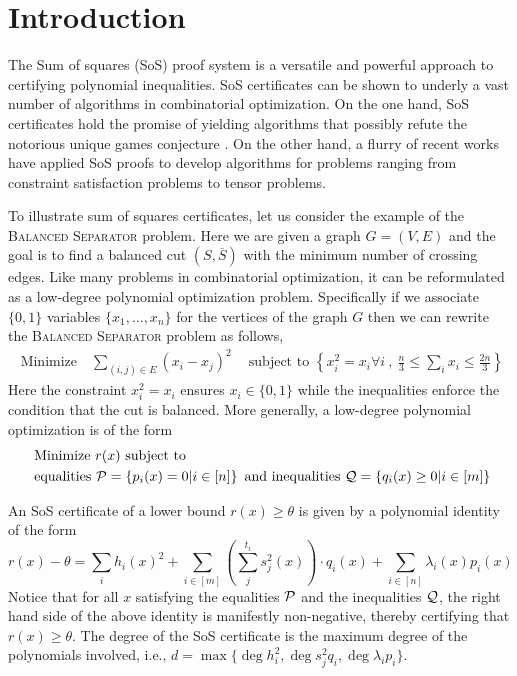 \section{Introduction}
\label{sec:intro}

The Sum of squares (SoS) proof system is a versatile and powerful approach to certifying polynomial inequalities. 
%
SoS certificates can be shown to underly a vast number of algorithms in combinatorial optimization. 
%
On the one hand, SoS certificates hold the promise of yielding algorithms that possibly refute the notorious unique games conjecture \cite{BBHKSZ12, barak2011rounding,GuruswamiS11}.  
%
On the other hand, a flurry of recent works have applied SoS proofs to develop algorithms for problems ranging from constraint satisfaction problems to tensor problems.  

To illustrate sum of squares certificates, let us consider the example of the
\textsc{Balanced Separator} problem.  Here we are given a graph $G = (V,E)$ and the goal is to find a balanced cut $(S,\overline{S})$ with the minimum number of crossing edges.
%
Like many problems in combinatorial optimization, it can be reformulated as a low-degree polynomial optimization problem.  
%
Specifically if we associate $\{0,1\}$ variables $\{x_1,\ldots,x_n\}$ for the vertices of the graph $G$ then we can rewrite the \textsc{Balanced Separator} problem as follows,
\begin{align*}
\text{ Minimize } \ \ \  \sum_{(i,j) \in E} (x_i-x_j)^2  \ \ \ \ \text{ subject to } \left\{ x_i^2 = x_i \forall i\ , \ \frac{n}{3} \leq \sum_i x_i \leq \frac{2n}{3} \right\}
\end{align*} 
Here the constraint $x_i^2 = x_i$ ensures $x_i \in \{0,1\}$ while the inequalities enforce the condition that the cut is balanced. More generally, a low-degree polynomial optimization is of the form
\begin{align*}
&\text{ Minimize } r(x) \text{ subject to } \\ &\text{ equalities } \mathcal P = \left\{ p_i(x) = 0 | i \in [n] \right\} \text{ and inequalities } \mathcal Q = \left\{ q_i(x) \geq 0 | i \in [m] \right\}
\end{align*} 

An SoS certificate of a lower bound $ r(x) \geq \theta$ is given by a polynomial identity of the form
\[ r(x) - \theta  = \sum_{i} h_i(x)^2 + \sum_{i \in [m]} \left(\sum_{j}^{t_i} s_j^2(x) \right) \cdot q_i(x) + \sum_{i \in [n]} \lambda_i(x) p_i(x) \]
Notice that for all $x$ satisfying the equalities $\mathcal P$ and the inequalities $\mathcal Q$, the right hand side of the above identity is manifestly non-negative, thereby certifying that $r(x) \geq \theta$.  The degree of the SoS certificate is the maximum degree of the polynomials involved, i.e., $d = \max\{\deg h_i^2, \deg s_j^2 q_i, \deg \lambda_i p_i\}$.

